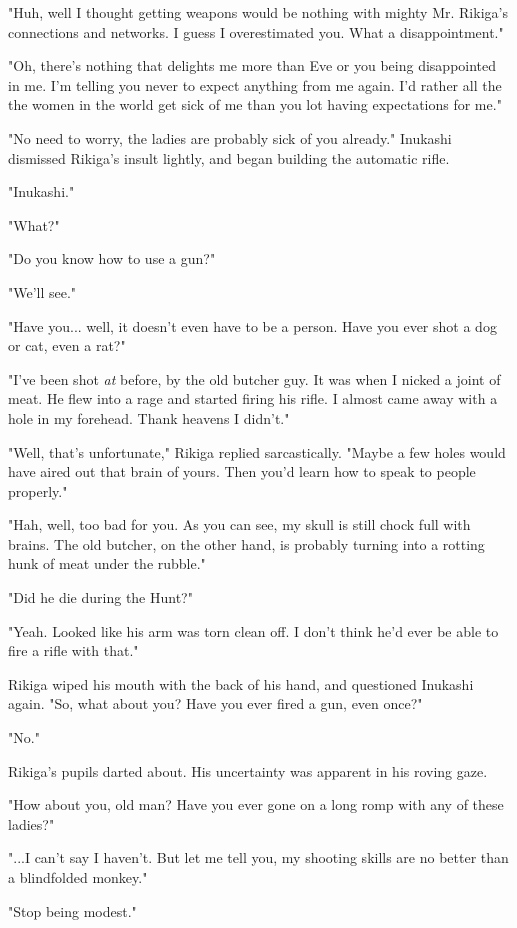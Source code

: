 "Huh, well I thought getting weapons would be nothing with mighty Mr.
Rikiga's connections and networks. I guess I overestimated you. What a
disappointment."

"Oh, there's nothing that delights me more than Eve or you being
disappointed in me. I'm telling you never to expect anything from me
again. I'd rather all the the women in the world get sick of me than you
lot having expectations for me."

"No need to worry, the ladies are probably sick of you already."
Inukashi dismissed Rikiga's insult lightly, and began building the
automatic rifle.

"Inukashi."

"What?"

"Do you know how to use a gun?"

"We'll see."

"Have you... well, it doesn't even have to be a person. Have you ever
shot a dog or cat, even a rat?"

"I've been shot \emph{at} before, by the old butcher guy. It was when I nicked
a joint of meat. He flew into a rage and started firing his rifle. I
almost came away with a hole in my forehead. Thank heavens I didn't."

"Well, that's unfortunate," Rikiga replied sarcastically. "Maybe a few
holes would have aired out that brain of yours. Then you'd learn how to
speak to people properly."

"Hah, well, too bad for you. As you can see, my skull is still chock
full with brains. The old butcher, on the other hand, is probably
turning into a rotting hunk of meat under the rubble."

"Did he die during the Hunt?"

"Yeah. Looked like his arm was torn clean off. I don't think he'd ever
be able to fire a rifle with that."

Rikiga wiped his mouth with the back of his hand, and questioned
Inukashi again. "So, what about you? Have you ever fired a gun, even
once?"

"No."

Rikiga's pupils darted about. His uncertainty was apparent in his roving
gaze.

"How about you, old man? Have you ever gone on a long romp with any of
these ladies?"

"...I can't say I haven't. But let me tell you, my shooting skills are
no better than a blindfolded monkey."

"Stop being modest."

